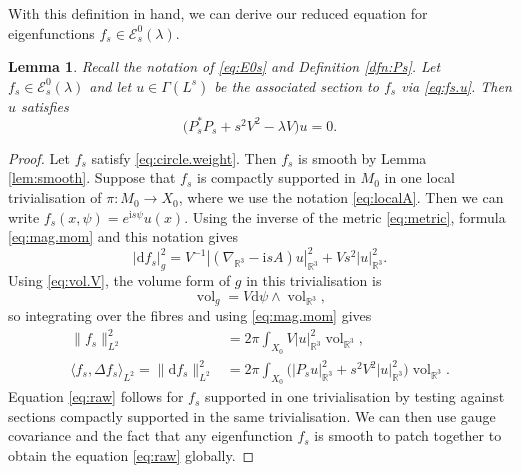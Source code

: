 \documentclass{article}
\newtheorem{lem}[thm]{Lemma}
\theoremstyle{definition}
\numberwithin{thm}{section}
\numberwithin{equation}{section}
\DeclareMathOperator\vol{vol}
\def\R{\mathbb{R}}
\def\d{\mathrm{d}}
\newcommand{\ii}{\mathrm i}
\newcommand{\dd}{\mathrm d}
\newcommand{\ip}[2]{\langle #1,#2\rangle}
\newcommand{\norm}[1]{\lVert #1\rVert}
\begin{document}
With this definition in hand, we can derive our reduced equation for eigenfunctions $f_s\in\mathcal{E}^0_s(\lambda)$.

\begin{lem}%
\label{lem:reduction}  Recall the notation of \eqref{eq:E0s} and Definition \ref{dfn:Ps}. 
Let $f_s\in\mathcal{E}^0_s(\lambda)$ and let $u\in\Gamma(L^s)$ be the associated section to $f_s$ via \eqref{eq:fs.u}. Then $u$ satisfies  
\begin{equation}\label{eq:raw}
        \bigl(P_s^*P_s+s^2V^2-\lambda V\bigr)u=0.
\end{equation}

\end{lem}

\begin{proof}
Let $f_s$ satisfy \eqref{eq:circle.weight}.  Then $f_s$ is smooth by Lemma \ref{lem:smooth}.  Suppose that $f_s$ is compactly supported in $M_0$ in one local trivialisation of $\pi:M_0\to X_0$, where we use the notation \eqref{eq:localA}. Then we can  write $f_s(x,\psi)=e^{\ii s\psi}u(x)$.      
 Using the inverse of the metric \eqref{eq:metric}, formula \eqref{eq:mag.mom} and this notation gives
\begin{equation}
        |\dd f_s|_g^2
        =V^{-1}|(\nabla_{\R^3}-\ii sA)u|_{\R^3}^2+Vs^2|u|_{\R^3}^2.
\end{equation}
Using \eqref{eq:vol.V}, the volume form of $g$ in this trivialisation is 
\begin{equation}
    \vol_g=V\dd\psi\wedge\vol_{\R^3},
\end{equation}  
so integrating over the fibres and using \eqref{eq:mag.mom} gives   
\begin{align}
        \norm{f_s}_{L^2}^2
        &=2\pi\int_{X_0}V|u|_{\R^3}^2\vol_{\R^3},\label{eq:norm}\\
        \ip{f_s}{\Delta f_s}_{L^2}=\norm{\d f_s}_{L^2}^2
        &=2\pi\int_{X_0}\bigl(|P_su|_{\R^3}^2+s^2V^2|u|_{\R^3}^2\bigr)\vol_{\R^3}.\label{eq:form}
\end{align}
Equation \eqref{eq:raw} follows for $f_s$ supported in one trivialisation by testing against sections compactly supported in the same trivialisation.  We can then use gauge covariance and the fact that any eigenfunction $f_s$ is smooth to patch together to obtain the equation \eqref{eq:raw} globally.
\end{proof}
\end{document}
